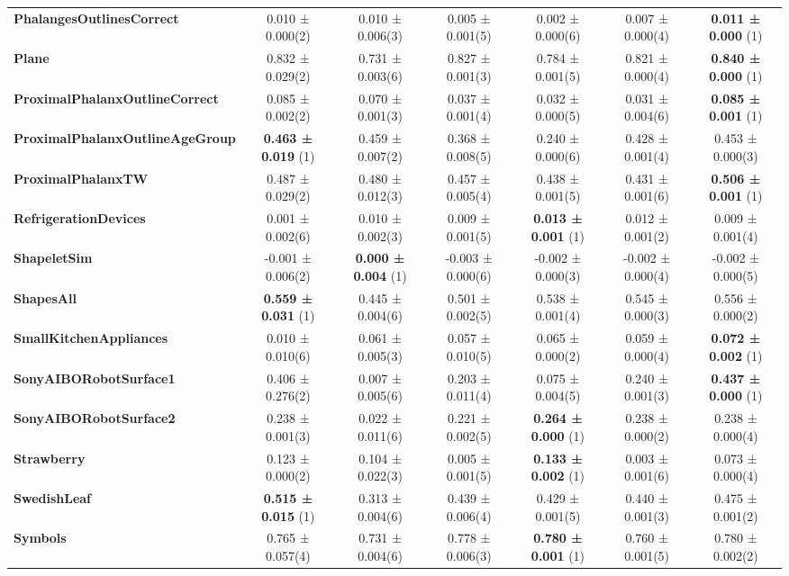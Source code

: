 \begin{table}[ht]
\begin{adjustbox}{width=\textwidth}
\begin{tabular}{lcccccc}
    \textbf{PhalangesOutlinesCorrect} & 0.010 ± 0.000(2) & 0.010 ± 0.006(3) & 0.005 ± 0.001(5) & 0.002 ± 0.000(6) & 0.007 ± 0.000(4) & \textbf{0.011 ± 0.000} (1) \\
    \textbf{Plane} & 0.832 ± 0.029(2) & 0.731 ± 0.003(6) & 0.827 ± 0.001(3) & 0.784 ± 0.001(5) & 0.821 ± 0.000(4) & \textbf{0.840 ± 0.000} (1) \\
    \textbf{ProximalPhalanxOutlineCorrect} & 0.085 ± 0.002(2) & 0.070 ± 0.001(3) & 0.037 ± 0.001(4) & 0.032 ± 0.000(5) & 0.031 ± 0.004(6) & \textbf{0.085 ± 0.001} (1) \\
    \textbf{ProximalPhalanxOutlineAgeGroup} & \textbf{0.463 ± 0.019} (1) & 0.459 ± 0.007(2) & 0.368 ± 0.008(5) & 0.240 ± 0.000(6) & 0.428 ± 0.001(4) & 0.453 ± 0.000(3) \\
    \textbf{ProximalPhalanxTW} & 0.487 ± 0.029(2) & 0.480 ± 0.012(3) & 0.457 ± 0.005(4) & 0.438 ± 0.001(5) & 0.431 ± 0.001(6) & \textbf{0.506 ± 0.001} (1) \\
    \textbf{RefrigerationDevices} & 0.001 ± 0.002(6) & 0.010 ± 0.002(3) & 0.009 ± 0.001(5) & \textbf{0.013 ± 0.001} (1) & 0.012 ± 0.001(2) & 0.009 ± 0.001(4) \\
    \textbf{ShapeletSim} & -0.001 ± 0.006(2) & \textbf{0.000 ± 0.004} (1) & -0.003 ± 0.000(6) & -0.002 ± 0.000(3) & -0.002 ± 0.000(4) & -0.002 ± 0.000(5) \\
    \textbf{ShapesAll} & \textbf{0.559 ± 0.031} (1) & 0.445 ± 0.004(6) & 0.501 ± 0.002(5) & 0.538 ± 0.001(4) & 0.545 ± 0.000(3) & 0.556 ± 0.000(2) \\
    \textbf{SmallKitchenAppliances} & 0.010 ± 0.010(6) & 0.061 ± 0.005(3) & 0.057 ± 0.010(5) & 0.065 ± 0.000(2) & 0.059 ± 0.000(4) & \textbf{0.072 ± 0.002} (1) \\
    \textbf{SonyAIBORobotSurface1} & 0.406 ± 0.276(2) & 0.007 ± 0.005(6) & 0.203 ± 0.011(4) & 0.075 ± 0.004(5) & 0.240 ± 0.001(3) & \textbf{0.437 ± 0.000} (1) \\
    \textbf{SonyAIBORobotSurface2} & 0.238 ± 0.001(3) & 0.022 ± 0.011(6) & 0.221 ± 0.002(5) & \textbf{0.264 ± 0.000} (1) & 0.238 ± 0.000(2) & 0.238 ± 0.000(4) \\
    \textbf{Strawberry} & 0.123 ± 0.000(2) & 0.104 ± 0.022(3) & 0.005 ± 0.001(5) & \textbf{0.133 ± 0.002} (1) & 0.003 ± 0.001(6) & 0.073 ± 0.000(4) \\
    \textbf{SwedishLeaf} & \textbf{0.515 ± 0.015} (1) & 0.313 ± 0.004(6) & 0.439 ± 0.006(4) & 0.429 ± 0.001(5) & 0.440 ± 0.001(3) & 0.475 ± 0.001(2) \\
    \textbf{Symbols} & 0.765 ± 0.057(4) & 0.731 ± 0.004(6) & 0.778 ± 0.006(3) & \textbf{0.780 ± 0.001} (1) & 0.760 ± 0.001(5) & 0.780 ± 0.002(2) \\

\end{tabular}
\end{adjustbox}
\end{table}
